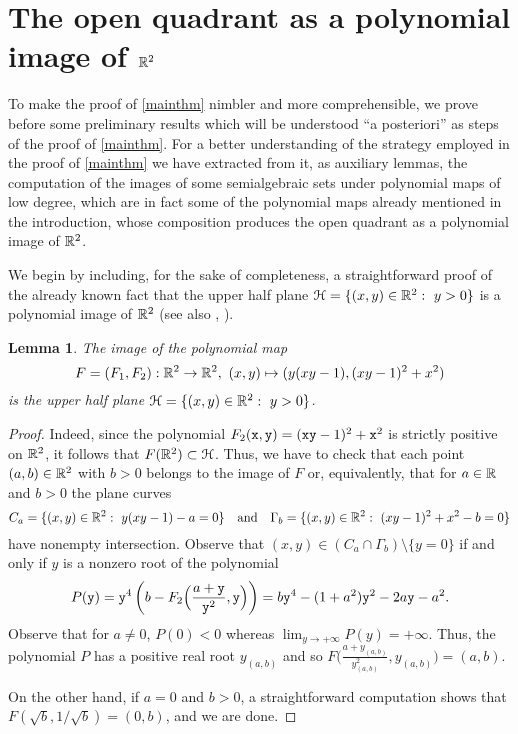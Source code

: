 \documentclass[11pt,a4paper]{amsart}
\newtheorem{lem}[theor]{Lemma}
\theoremstyle{definition}
\theoremstyle{remark}
\newcommand{\halfplane}{{\EuScript H}}
\newcommand{\x}{{\tt x}} \newcommand{\y}{{\tt y}}
\begin{document}
\section{The open quadrant as a polynomial image of ${\mathbb R}^2$}\label{s2}

To make the proof of \ref{mainthm} nimbler and more comprehensible, we prove before some preliminary results which will be understood ``a posteriori'' as steps of the proof of \ref{mainthm}. For a better understanding of the strategy employed in the proof of \ref{mainthm} we have extracted from it, as auxiliary lemmas, the computation of the images of some semialgebraic sets under polynomial maps of low degree, which are in fact some of the polynomial maps already mentioned in the introduction, whose composition produces the open quadrant as a polynomial image of ${\mathbb R}^2$.

We begin by including, for the sake of completeness, a straightforward proof of the already known fact that the upper half plane $\halfplane=\{(x,y)\in\R^2:\ y>0\}$ is a polynomial image of ${\mathbb R}^2$ (see also \cite[1.4(iv)]{fg1}, \cite{u1}).

\begin{lem}\label{step1}
The image of the polynomial map 
$$
F=(F_1,F_2):\R^2\to\R^2,\ (x,y)\mapsto(y(xy-1),(xy-1)^2+x^2)
$$ 
is the upper half plane $\halfplane=\{(x,y)\in\R^2:\ y>0\}$.
\end{lem}
\begin{proof}
Indeed, since the polynomial $F_2(\x,\y)=(\x\y-1)^2+\x^2$ is strictly positive on ${\mathbb R}^2$, it follows that $F(\R^2)\subset\halfplane$. Thus, we have to check that each point $(a,b)\in{\mathbb R}^2$ with $b>0$ belongs to the image of $F$ or, equivalently, that for $a\in{\mathbb R}$ and $b>0$ the plane curves 
$$
C_a=\{(x,y)\in\R^2:\ y(xy-1)-a=0\}\quad\text{and}\quad\Gamma_b=\{(x,y)\in\R^2:\ (xy-1)^2+x^2-b=0\}
$$ 
have nonempty intersection. Observe that $(x,y)\in(C_a\cap\Gamma_b)\setminus\{y=0\}$ if and only if $y$ is a nonzero root of the polynomial 
$$
P(\y)=\y^4\left(b-F_2\Big(\frac{a+\y}{\y^2},\y\Big)\right)=b\y^4-(1+a^2)\y^2-2a\y-a^2.
$$
Observe that for $a\neq0$, $P(0)<0$ whereas $\lim_{y\to+\infty}P(y)=+\infty$. Thus, the polynomial $P$ has a positive real root $y_{(a,b)}$ and so 
$F\Big(\frac{a+y_{(a,b)}}{y_{(a,b)}^2},y_{(a,b)}\Big)=(a,b)$. 

On the other hand, if $a=0$ and $b>0$, a straightforward computation shows that $F(\sqrt{b},1/\sqrt{b})=(0,b)$, and we are done.
\end{proof}
\end{document}
